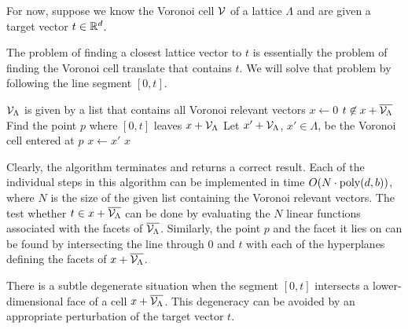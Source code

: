 For now, suppose we know the Voronoi cell $\mathcal{V}$ of a lattice $\Lambda$
and are given a target vector $t \in \mathbb{R}^d$.
\begin{center}
\end{center}
The problem of finding a closest lattice vector to $t$
is essentially the problem of finding the Voronoi cell translate that contains $t$.
We will solve that problem by following the line segment $[0,t]$.
\begin{codebox}
  \zi $\mathcal{V}_\Lambda$ is given by a list that contains all Voronoi relevant vectors
  \li $x \gets 0$
  \li \While $t \not\in x + \overline{\mathcal{V}_\Lambda}$
  \li \Do Find the point $p$ where $[0,t]$ leaves $x + \mathcal{V}_\Lambda$
  \li     Let $x' + \mathcal{V}_\Lambda$, $x' \in \Lambda$, be the Voronoi cell entered at $p$
  \li     $x \gets x'$
      \End
  \li \Return $x$
\end{codebox}
Clearly, the algorithm terminates and returns a correct result.
Each of the individual steps in this algorithm can be implemented in time $O(N \cdot \operatorname{poly}(d,b))$,
where $N$ is the size of the given list containing the Voronoi relevant vectors.
The test whether $t \in x + \overline{\mathcal{V}_\Lambda}$ can be done by evaluating the $N$ linear functions
associated with the facets of $\overline{\mathcal{V}_\Lambda}$.
Similarly, the point $p$ and the facet it lies on can be found by intersecting the line through $0$ and $t$
with each of the hyperplanes defining the facets of $x + \overline{\mathcal{V}_\Lambda}$.

There is a subtle degenerate situation when the segment $[0,t]$ intersects a lower-dimensional
face of a cell $x + \overline{\mathcal{V}_\Lambda}$.
This degeneracy can be avoided by an appropriate perturbation of the target vector $t$.

